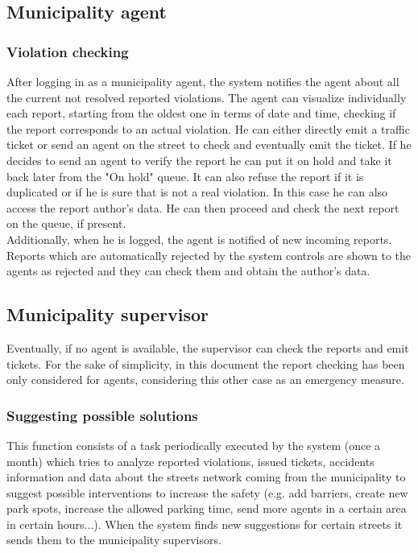 \documentclass[a4paper]{report}
\begin{document}
\subsection{Municipality agent}
\label{sub-agentfun}
\subsubsection{Violation checking}
After logging in as a municipality agent, the system notifies the agent about all the current not resolved reported violations. The agent can visualize individually each report, starting from the oldest one in terms of date and time, checking if the report corresponds to an actual violation. He can either directly emit a traffic ticket or send an agent on the street to check and eventually emit the ticket.  If he decides to send an agent to verify the report he can put it on hold and take it back later from the "On hold" queue. It can also refuse the report if it is duplicated or if he is sure that is not a real violation. In this case he can also access the report author's data. He can then proceed and check the next report on the queue, if present.\\
Additionally, when he is logged, the agent is notified of new incoming reports.\\
Reports which are automatically rejected by the system controls are shown to the agents as rejected and they can check them and obtain the author's data.


\subsection{Municipality supervisor}

Eventually, if no agent is available, the supervisor can check the reports and emit tickets. For the sake of simplicity, in this document the report checking has been only considered for agents, considering this other case as an emergency measure.

\subsubsection{Suggesting possible solutions} 
This function consists of a task periodically executed by the system (once a month) which tries to analyze reported violations, issued tickets, accidents information and data about the streets network coming from the municipality to suggest possible interventions to increase the safety (e.g. add barriers, create new park spots, increase the allowed parking time, send more agents in a certain area in certain hours...). When the system finds new suggestions for certain streets it sends them to the municipality supervisors.
\end{document}

